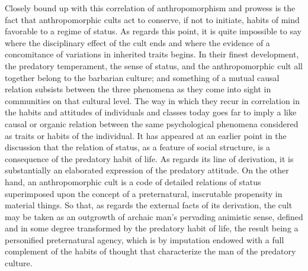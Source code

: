 \documentclass[12pt]{report}
\begin{document}
Closely bound up with this correlation of anthropomorphism and prowess
is the fact that anthropomorphic cults act to conserve, if not to
initiate, habits of mind favorable to a regime of status. As regards
this point, it is quite impossible to say where the disciplinary effect
of the cult ends and where the evidence of a concomitance of variations
in inherited traits begins. In their finest development, the predatory
temperament, the sense of status, and the anthropomorphic cult all
together belong to the barbarian culture; and something of a mutual
causal relation subsists between the three phenomena as they come into
sight in communities on that cultural level. The way in which they recur
in correlation in the habits and attitudes of individuals and classes
today goes far to imply a like causal or organic relation between the
same psychological phenomena considered as traits or habits of the
individual. It has appeared at an earlier point in the discussion
that the relation of status, as a feature of social structure, is a
consequence of the predatory habit of life. As regards its line
of derivation, it is substantially an elaborated expression of the
predatory attitude. On the other hand, an anthropomorphic cult is a
code of detailed relations of status superimposed upon the concept of
a preternatural, inscrutable propensity in material things. So that, as
regards the external facts of its derivation, the cult may be taken as
an outgrowth of archaic man's pervading animistic sense, defined and in
some degree transformed by the predatory habit of life, the result being
a personified preternatural agency, which is by imputation endowed with
a full complement of the habits of thought that characterize the man of
the predatory culture.
\end{document}
